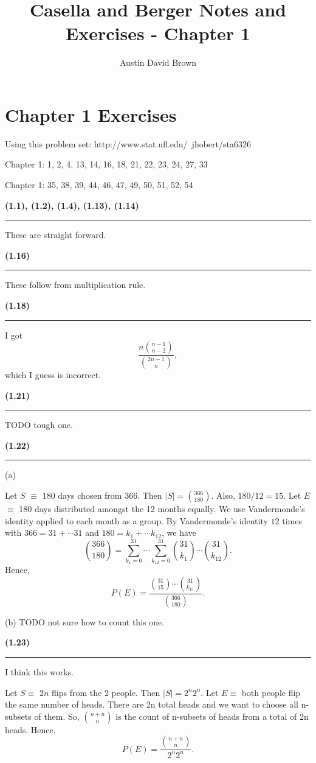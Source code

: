 \documentclass[12pt, reqno]{amsart}
\numberwithin{equation}{section}
\begin{document}
\title{Casella and Berger Notes and Exercises -  Chapter 1}
\author{Austin David Brown}
\maketitle

\section*{Chapter 1 Exercises}

Using this problem set:
http://www.stat.ufl.edu/~jhobert/sta6326

Chapter 1: 1, 2, 4, 13, 14, 16, 18, 21, 22, 23, 24, 27, 33

Chapter 1: 35, 38, 39, 44, 46, 47, 49, 50, 51, 52, 54

{\bf (1.1), (1.2), (1.4), (1.13), (1.14) \rule{\textwidth}{.5pt}}

These are straight forward.

{\bf (1.16)\rule{\textwidth}{.5pt}}

These follow from multiplication rule.

{\bf (1.18)\rule{\textwidth}{.5pt}}

I got
\[
\frac{n \binom{n - 1}{n - 2} }{ \binom{2n - 1}{n} },
\]
which I guess is incorrect.

{\bf (1.21)\rule{\textwidth}{.5pt}}

TODO tough one.

{\bf (1.22)\rule{\textwidth}{.5pt}}

(a)

Let $S$ $\equiv$ 180 days chosen from 366.
Then $|S| = \binom{366}{180}$.
Also, $180/12 = 15$.
Let $E$ $\equiv$ 180 days distributed amongst the 12 months equally.
We use Vandermonde's identity applied to each month as a group.
By Vandermonde's identity $12$ times with $366 = 31 + \cdots 31$ and $180 = k_1 + \cdots k_{12}$, we have
\[
\binom{366}{180}
= \sum_{k_1 = 0}^{31} \cdots \sum_{k_{12} = 0}^{31} \binom{31}{k_1} \cdots \binom{31}{k_{12}}.
\]
Hence,
\[
P(E) = \frac{\binom{31}{15} \cdots \binom{31}{k_{15}}}{\binom{366}{180}}.
\]

(b)
TODO not sure how to count this one.

{\bf (1.23)\rule{\textwidth}{.5pt}}

I think this works.

Let $S \equiv$ $2n$ flips from the $2$ people.
Then $|S| = 2^n 2^n$.
Let $E \equiv$ both people flip the same number of heads.
There are 2n total heads and we want to choose all n-subsets of them.
So, $\binom{n + n}{n}$ is the count of n-subsets of heads from a total of 2n heads.
Hence,
\[
P(E) = \frac{\binom{n + n}{n}}{2^n 2^n}.
\]
\end{document}

